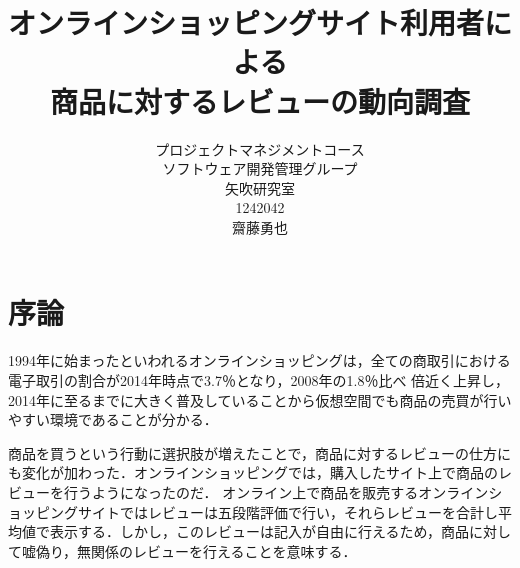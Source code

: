 \title{オンラインショッピングサイト利用者による\\商品に対するレビューの動向調査}
\author{プロジェクトマネジメントコース\\
ソフトウェア開発管理グループ\\
矢吹研究室\\
1242042\\
齋藤勇也}
\date{}




\maketitle





\tableofcontents%



\chapter{序論}

1994年に始まったといわれる\cite{sugasaka2003}オンラインショッピングは，全ての商取引における電子取引の割合が2014年時点で3.7％となり，2008年の1.8％比べ 倍近く上昇し\cite{keizai2014}，2014年に至るまでに大きく普及していることから仮想空間でも商品の売買が行いやすい環境であることが分かる．

商品を買うという行動に選択肢が増えたことで，商品に対するレビューの仕方にも変化が加わった．オンラインショッピングでは，購入したサイト上で商品のレビューを行うようになったのだ．
オンライン上で商品を販売するオンラインショッピングサイトではレビューは五段階評価で行い，それらレビューを合計し平均値で表示する．しかし，このレビューは記入が自由に行えるため，商品に対して嘘偽り，無関係のレビューを行えることを意味する．

